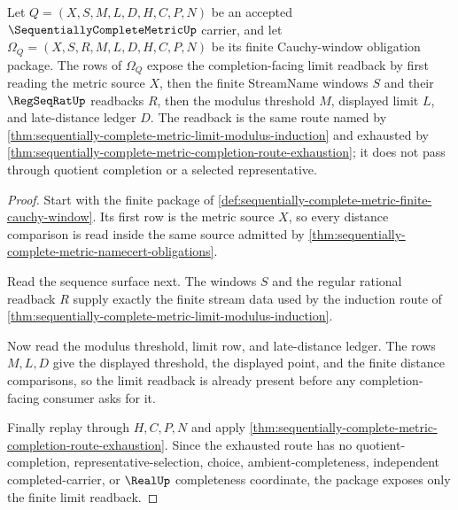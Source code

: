 \begin{theorem}
\label{thm:sequentially-complete-metric-limit-readback-package}
Let $Q=(X,S,M,L,D,H,C,P,N)$ be an accepted $\SequentiallyCompleteMetricUp$ carrier, and let $\Omega_Q=(X,S,R,M,L,D,H,C,P,N)$ be its finite Cauchy-window obligation package. The rows of $\Omega_Q$ expose the completion-facing limit readback by first reading the metric source $X$, then the finite StreamName windows $S$ and their $\RegSeqRatUp$ readbacks $R$, then the modulus threshold $M$, displayed limit $L$, and late-distance ledger $D$. The readback is the same route named by \autoref{thm:sequentially-complete-metric-limit-modulus-induction} and exhausted by \autoref{thm:sequentially-complete-metric-completion-route-exhaustion}; it does not pass through quotient completion or a selected representative.
\end{theorem}
\begin{proof}
Start with the finite package of \autoref{def:sequentially-complete-metric-finite-cauchy-window}. Its first row is the metric source $X$, so every distance comparison is read inside the same source admitted by \autoref{thm:sequentially-complete-metric-namecert-obligations}.

Read the sequence surface next. The windows $S$ and the regular rational readback $R$ supply exactly the finite stream data used by the induction route of \autoref{thm:sequentially-complete-metric-limit-modulus-induction}.

Now read the modulus threshold, limit row, and late-distance ledger. The rows $M,L,D$ give the displayed threshold, the displayed point, and the finite distance comparisons, so the limit readback is already present before any completion-facing consumer asks for it.

Finally replay through $H,C,P,N$ and apply \autoref{thm:sequentially-complete-metric-completion-route-exhaustion}. Since the exhausted route has no quotient-completion, representative-selection, choice, ambient-completeness, independent completed-carrier, or $\RealUp$ completeness coordinate, the package exposes only the finite limit readback.
\end{proof}

